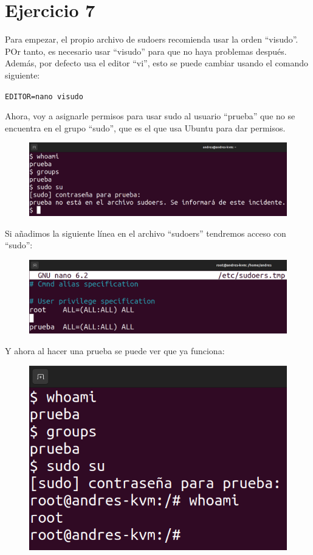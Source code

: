 \documentclass{article}
\begin{document}
\section*{Ejercicio 7}
Para empezar, el propio archivo de sudoers recomienda usar la orden ``visudo''. POr tanto, es necesario usar ``visudo'' para que no haya problemas después. Además, por defecto usa el editor ``vi'', esto se puede cambiar usando el comando siguiente:

\verb|EDITOR=nano visudo|

Ahora, voy a asignarle permisos para usar sudo al usuario ``prueba'' que no se encuentra en el grupo ``sudo'', que es el que usa Ubuntu para dar permisos.

\begin{figure}[H]
    \includegraphics[width=\textwidth]{imagenes/sudoprueba.png}
\end{figure}

Si añadimos la siguiente línea en el archivo ``sudoers'' tendremos acceso con ``sudo'':

\begin{figure}[H]
    \includegraphics[width=\textwidth]{imagenes/sudoersprueba.png}
\end{figure}


Y ahora al hacer una prueba se puede ver que ya funciona:

\begin{figure}[H]
    \includegraphics[width=\textwidth]{imagenes/sudopruebaok.png}
\end{figure}
\end{document}
